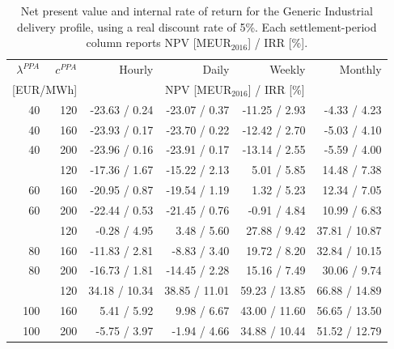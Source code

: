 \begin{table}[H]
\centering
\small
\caption{Net present value and internal rate of return for the Generic Industrial delivery profile, using a real discount rate of 5\%. Each settlement-period column reports NPV [MEUR$_{2016}$] / IRR [\%].}
\label{tab:npv_irr_generic_industrial}
\begin{tabular*}{\textwidth}{@{\extracolsep{\fill}}rrrrrr@{}}
\toprule
$\lambda^{PPA}$ & $c^{PPA}$ & Hourly & Daily & Weekly & Monthly \\
\multicolumn{2}{c}{[EUR/MWh]} & \multicolumn{4}{c}{NPV [MEUR$_{2016}$] / IRR [\%]} \\
\midrule
40 & 120 & -23.63 / 0.24 & -23.07 / 0.37 & -11.25 / 2.93 & -4.33 / 4.23 \\
40 & 160 & -23.93 / 0.17 & -23.70 / 0.22 & -12.42 / 2.70 & -5.03 / 4.10 \\
40 & 200 & -23.96 / 0.16 & -23.91 / 0.17 & -13.14 / 2.55 & -5.59 / 4.00 \\
\addlinespace
60 & 120 & -17.36 / 1.67 & -15.22 / 2.13 & 5.01 / 5.85 & 14.48 / 7.38 \\
60 & 160 & -20.95 / 0.87 & -19.54 / 1.19 & 1.32 / 5.23 & 12.34 / 7.05 \\
60 & 200 & -22.44 / 0.53 & -21.45 / 0.76 & -0.91 / 4.84 & 10.99 / 6.83 \\
\addlinespace
80 & 120 & -0.28 / 4.95 & 3.48 / 5.60 & 27.88 / 9.42 & 37.81 / 10.87 \\
80 & 160 & -11.83 / 2.81 & -8.83 / 3.40 & 19.72 / 8.20 & 32.84 / 10.15 \\
80 & 200 & -16.73 / 1.81 & -14.45 / 2.28 & 15.16 / 7.49 & 30.06 / 9.74 \\
\addlinespace
100 & 120 & 34.18 / 10.34 & 38.85 / 11.01 & 59.23 / 13.85 & 66.88 / 14.89 \\
100 & 160 & 5.41 / 5.92 & 9.98 / 6.67 & 43.00 / 11.60 & 56.65 / 13.50 \\
100 & 200 & -5.75 / 3.97 & -1.94 / 4.66 & 34.88 / 10.44 & 51.52 / 12.79 \\
\bottomrule
\end{tabular*}
\end{table}

